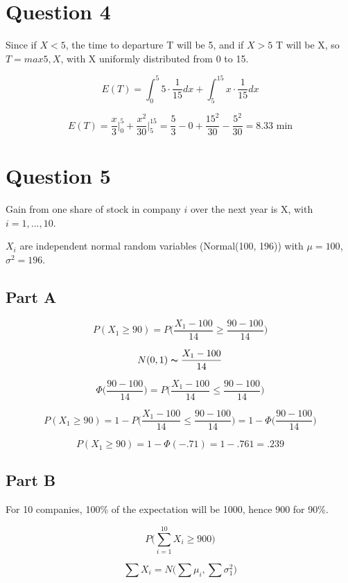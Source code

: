 \documentclass[letterpaper]{article}
\begin{document}
\newpage

\section*{Question 4}

Since if $X < 5$, the time to departure  T will be 5, and if $X > 5$ T will be X, so $T = max{5, X}$, with X uniformly distributed from 0 to 15.

$$E(T) = \int_0^5 5 \cdot \frac{1}{15} dx + \int_5^{15} x \cdot \frac{1}{15} dx$$

$$E(T) = \frac{x}{3} \Big|_0^5 + \frac{x^2}{30} \Big|_5^{15} = \frac{5}{3} - 0 + \frac{15^2}{30} - \frac{5^2}{30} = 8.33 \text{ min}$$

\newpage

\section*{Question 5}

Gain from one share of stock in company $i$ over the next year is X, with $i = 1,...,10$.

\noindent $X_i$ are independent normal random variables (Normal(100, 196)) with $\mu = 100$, $\sigma^2 = 196$.

\subsection*{Part A}

$$P(X_1 \geq 90) = P \Big( \frac{X_1 - 100}{14} \geq \frac{90 - 100}{14} \Big)$$

$$N(0, 1) \thicksim \frac{X_1 - 100}{14}$$

$$\Phi \Big( \frac{90 - 100}{14} \Big) = P \Big( \frac{X_1 - 100}{14} \leq \frac{90 - 100}{14} \Big)$$

$$P(X_1 \geq 90) = 1 - P \Big( \frac{X_1 - 100}{14} \leq \frac{90 - 100}{14} \Big) = 1 - \Phi \Big( \frac{90 - 100}{14} \Big)$$

$$P(X_1 \geq 90) = 1 - \Phi(-.71) = 1 - .761 = .239$$

\subsection*{Part B}

For 10 companies, 100\% of the expectation will be 1000, hence 900 for 90\%.

$$P \Big( \sum_{i=1}^{10} X_i \geq  900 \Big)$$

$$\sum X_i = N \Big( \sum \mu_i, \sum \sigma_1^2\Big)$$
\end{document}
